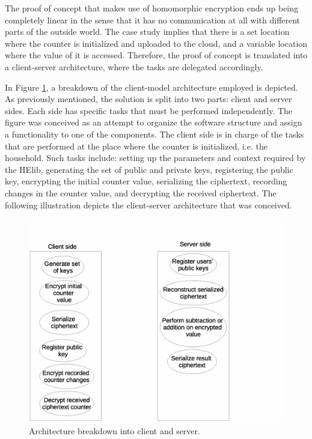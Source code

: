 The proof of concept that makes use of homomorphic encryption ends up being completely linear in the sense that it has no communication at all with different parts of the outside world. The case study implies that there is a set location where the counter is initialized and uploaded to the cloud, and a variable location where the value of it is accessed. Therefore, the proof of concept is translated into a client-server architecture, where the tasks are delegated accordingly. 

In Figure \ref{fig:clientserver}, a breakdown of the client-model architecture employed is depicted. As previously mentioned, the solution is split into two parts: client and server sides. Each side has specific tasks that must be performed independently. The figure was conceived as an attempt to organize the software structure and assign a functionality to one of the components. The client side is in charge of the tasks that are performed at the place where the counter is initialized, i.e. the household. Such tasks include: setting up the parameters and context required by the HElib, generating the set of public and private keys, registering the public key, encrypting the initial counter value, serializing the ciphertext, recording changes in the counter value, and decrypting the received ciphertext. The following illustration depicts the client-server architecture that was conceived. 

\begin{figure}[H]
  \centering 
  \includegraphics[scale=0.5]{clientserver}
  \caption{Architecture breakdown into client and server.}
  \label{fig:clientserver}
\end{figure}


